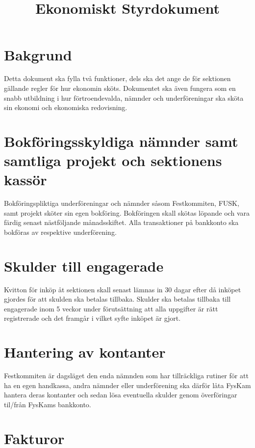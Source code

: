 \documentclass{dgovdoc}
\title{Ekonomiskt Styrdokument}
\begin{document}
\maketitle

\section{Bakgrund}

Detta dokument ska fylla två funktioner, dels ska det ange de för sektionen gällande regler för hur ekonomin sköts. Dokumentet ska även fungera som en snabb utbildning i hur förtroendevalda, nämnder och underföreningar ska sköta sin ekonomi och ekonomiska redovisning. 

\section{Bokföringsskyldiga nämnder samt samtliga projekt och sektionens kassör}

Bokföringspliktiga underföreningar och nämnder såsom Festkommiten, FUSK, samt projekt sköter sin egen bokföring. Bokföringen skall skötas löpande och vara färdig senast nästföljande månadsskiftet. Alla transaktioner på bankkonto ska bokföras av respektive underförening.

\section{Skulder till engagerade}

Kvitton för inköp åt sektionen skall senast lämnas in 30 dagar efter då inköpet gjordes för att skulden ska betalas tillbaka. Skulder ska betalas tillbaka till engagerade inom 5 veckor under förutsättning att alla uppgifter är rätt registrerade och det framgår i vilket syfte inköpet är gjort. 

\section{Hantering av kontanter}

Festkommiten är dagsläget den enda nämnden som har tillräckliga rutiner för att ha en egen handkassa, andra nämnder eller underförening ska därför låta FysKam hantera deras kontanter och sedan lösa eventuella skulder genom överföringar til/från FysKams bankkonto.

\section{Fakturor}
\end{document}
